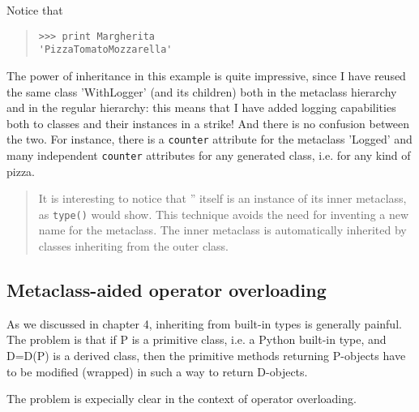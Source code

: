 \documentclass[10pt,english]{article}
\begin{document}
Notice that
\begin{quote}
\begin{verbatim}>>> print Margherita
'PizzaTomatoMozzarella'\end{verbatim}
\end{quote}

The power of inheritance in this example is quite impressive, since
I have reused the same class 'WithLogger' (and its children) both in the 
metaclass hierarchy and in the regular hierarchy: this means that I have added
logging capabilities both to classes and their instances in a
strike! And there is no confusion between the two. For instance,
there is a \texttt{counter} attribute for the metaclass 'Logged' 
and many independent \texttt{counter} attributes for any generated class,
i.e. for any kind of pizza.
\begin{quote}

It is interesting to notice that '' itself is an instance of
its inner metaclass, as \texttt{type()} would show. This technique
avoids the need for inventing a new name for the metaclass. The inner
metaclass is automatically inherited by classes inheriting from the outer
class.
\end{quote}



\hypertarget{metaclass-aided-operator-overloading}{}
\subsection*{Metaclass-aided operator overloading}

As we discussed in chapter 4, inheriting from built-in types is generally
painful. The problem is that if P is a primitive class, i.e. a 
Python built-in type, and D=D(P) is a derived class, then the 
primitive methods returning P-objects have to be modified (wrapped) in 
such a way to return D-objects.

The problem is expecially clear in the context of operator overloading.
\end{document}

